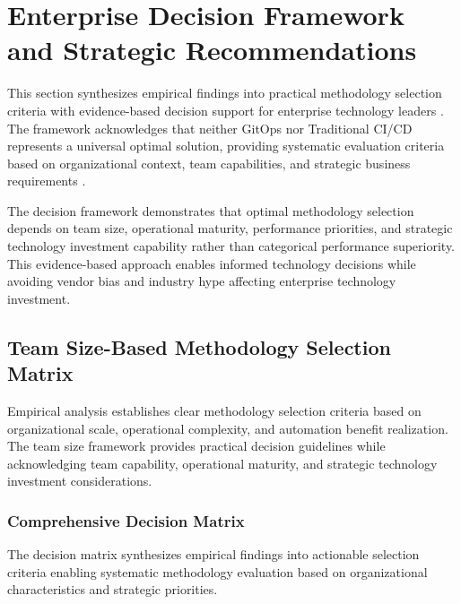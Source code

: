 \section{Enterprise Decision Framework and Strategic Recommendations}
\label{sec:enterprise_framework}

This section synthesizes empirical findings into practical methodology selection criteria with evidence-based decision support for enterprise technology leaders \cite{technology_adoption_frameworks}. The framework acknowledges that neither GitOps nor Traditional CI/CD represents a universal optimal solution, providing systematic evaluation criteria based on organizational context, team capabilities, and strategic business requirements \cite{enterprise_decision_making}.

The decision framework demonstrates that optimal methodology selection depends on team size, operational maturity, performance priorities, and strategic technology investment capability rather than categorical performance superiority. This evidence-based approach enables informed technology decisions while avoiding vendor bias and industry hype affecting enterprise technology investment.

\subsection{Team Size-Based Methodology Selection Matrix}
\label{subsec:team_size_matrix}

Empirical analysis establishes clear methodology selection criteria based on organizational scale, operational complexity, and automation benefit realization. The team size framework provides practical decision guidelines while acknowledging team capability, operational maturity, and strategic technology investment considerations.

\subsubsection{Comprehensive Decision Matrix}

The decision matrix synthesizes empirical findings into actionable selection criteria enabling systematic methodology evaluation based on organizational characteristics and strategic priorities.

